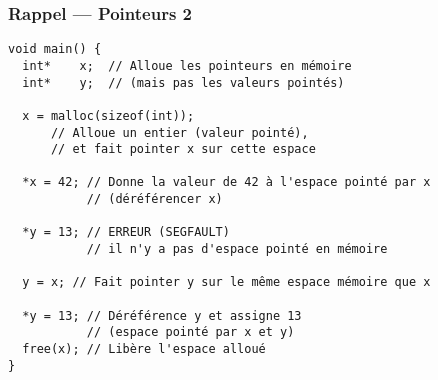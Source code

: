 \documentclass[12pt,svgnames]{beamer}
\begin{document}
\begin{frame}[fragile=singleslide]
	\frametitle{Rappel --- Pointeurs 2}
	\begin{adjustwidth}{-0.5em}{0em}
		\begin{verbatim}
void main() {   
  int*    x;  // Alloue les pointeurs en mémoire 
  int*    y;  // (mais pas les valeurs pointés)

  x = malloc(sizeof(int));
      // Alloue un entier (valeur pointé),
      // et fait pointer x sur cette espace
    
  *x = 42; // Donne la valeur de 42 à l'espace pointé par x
           // (déréférencer x)

  *y = 13; // ERREUR (SEGFAULT)
           // il n'y a pas d'espace pointé en mémoire

  y = x; // Fait pointer y sur le même espace mémoire que x
    
  *y = 13; // Déréférence y et assigne 13
           // (espace pointé par x et y)
  free(x); // Libère l'espace alloué
}
		\end{verbatim}
	\end{adjustwidth}
\end{frame}


\end{document}
